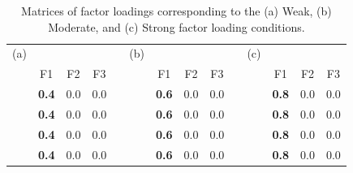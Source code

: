 \documentclass[11pt]{umnthesis}
\begin{document}
\begin{table}
\centering
\caption{\label{tab:factor-loadings} Matrices of factor loadings corresponding to the (a) Weak, (b) Moderate, and (c) Strong factor loading conditions.}

\begin{tabular}{llllllllllllll}
\multicolumn{1}{c}{(a)} &                        &                        &                        &                      & \multicolumn{1}{c}{(b)} &                        &                        &                        &                      & \multicolumn{1}{c}{(c)} &                        &                        &                         \\ 
\cline{2-4}\cline{7-9}\cline{12-14}
\multicolumn{1}{c}{}    & \multicolumn{1}{c}{F1} & \multicolumn{1}{c}{F2} & \multicolumn{1}{c}{F3} & \multicolumn{1}{c}{} & \multicolumn{1}{c}{}    & \multicolumn{1}{c}{F1} & \multicolumn{1}{c}{F2} & \multicolumn{1}{c}{F3} & \multicolumn{1}{c}{} & \multicolumn{1}{c}{}    & \multicolumn{1}{c}{F1} & \multicolumn{1}{c}{F2} & \multicolumn{1}{c}{F3}  \\ 
\cline{2-4}\cline{7-9}\cline{12-14}
                        & \textbf{0.4}           & 0.0                    & 0.0                    &                      &                         & \textbf{0.6}           & 0.0                    & 0.0                    &                      &                         & \textbf{0.8}           & 0.0                    & 0.0                     \\
                        & \textbf{0.4}           & 0.0                    & 0.0                    &                      &                         & \textbf{0.6}           & 0.0                    & 0.0                    &                      &                         & \textbf{0.8}           & 0.0                    & 0.0                     \\
                        & \textbf{0.4}           & 0.0                    & 0.0                    &                      &                         & \textbf{0.6}           & 0.0                    & 0.0                    &                      &                         & \textbf{0.8}           & 0.0                    & 0.0                     \\
                        & \textbf{0.4}           & 0.0                    & 0.0                    &                      &                         & \textbf{0.6}           & 0.0                    & 0.0                    &                      &                         & \textbf{0.8}           & 0.0                    & 0.0                     \\

\end{tabular}
\end{table}
\end{document}
